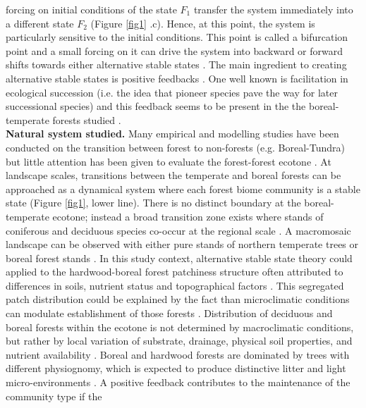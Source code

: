 forcing on initial conditions of the state $F_1$ transfer the system
immediately into a different state $F_2$ (Figure \ref{fig1} .c). Hence, at
this point, the system is particularly sensitive to the initial conditions.
This point is called a bifurcation point and a small forcing on it can drive
the system into backward or forward shifts towards either alternative stable
states \cite{scheffer2009critical}. The main ingredient to creating
alternative stable states is positive feedbacks \cite{scheffer2009critical}.
One well known is facilitation in ecological succession (i.e. the idea that
pioneer species pave the way for later successional species) and this feedback
seems to be present in the the boreal-temperate forests studied
\cite{Barras1998,Society2014}. \\


\textbf{Natural system studied.} Many empirical and modelling studies have been
conducted on the transition between forest to non-forests (e.g. Boreal-Tundra)
\cite{Scheffer2012,Scheffer2001,Hirota2011,Messaoud2007} but little
attention has been given to evaluate the forest-forest ecotone
\cite{Goldblum2010,Graignic2013,Messaoud2007}. At landscape scales, transitions
between the temperate and boreal forests can be approached as a dynamical
system where each forest biome community is a stable state (Figure \ref{fig1},
lower line). There is no distinct boundary at the boreal-temperate ecotone;
instead a broad transition zone exists where stands of coniferous and
deciduous species co-occur at the regional scale
\cite{Goldblum2010,Fisichelli2013}. A macromosaic landscape can be observed
with either pure stands of northern temperate trees or boreal forest stands
\cite{Goldblum2010,Fisichelli2013}. In this study context, alternative stable
state theory could applied to the hardwood-boreal forest patchiness structure
often attributed to differences in soils, nutrient status and topographical
factors \cite{Society2014}. This segregated patch distribution could be
explained by the fact than microclimatic conditions can modulate establishment
of those forests \cite{DeFrenne2013}. Distribution of deciduous and boreal
forests within the ecotone is not determined by macroclimatic conditions, but
rather by local variation of substrate, drainage, physical soil properties,
and nutrient availability \cite{Goldblum2010,Society2014}. Boreal and hardwood
forests are dominated by trees with different physiognomy, which is expected
to produce distinctive litter and light micro-environments \cite{Barras1998}.
A positive feedback contributes to the maintenance of the community type if the
